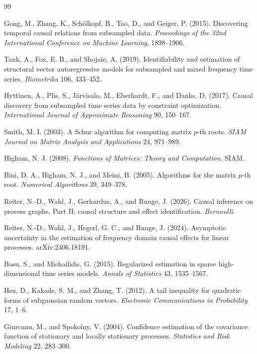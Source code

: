 \documentclass{article}
\begin{document}
\begin{thebibliography}{99}

   Gong, M., Zhang, K., Schölkopf, B., Tao, D., and Geiger, P. (2015). Discovering temporal causal relations from subsampled data. \emph{Proceedings of the 32nd International Conference on Machine Learning}, 1898--1906.

   Tank, A., Fox, E. B., and Shojaie, A. (2019). Identifiability and estimation of structural vector autoregressive models for subsampled and mixed frequency time series. \emph{Biometrika} 106, 433--452.

   Hyttinen, A., Plis, S., Järvisalo, M., Eberhardt, F., and Danks, D. (2017). Causal discovery from subsampled time series data by constraint optimization. \emph{International Journal of Approximate Reasoning} 90, 150--167.

   Smith, M. I. (2003). A Schur algorithm for computing matrix \(p\)-th roots. \emph{SIAM Journal on Matrix Analysis and Applications} 24, 971--989.

   Higham, N. J. (2008). \emph{Functions of Matrices: Theory and Computation}. SIAM.

   Bini, D. A., Higham, N. J., and Meini, B. (2005). Algorithms for the matrix \(p\)-th root. \emph{Numerical Algorithms} 39, 349--378.

   Reiter, N.-D., Wahl, J., Gerhardus, A., and Runge, J. (2026). Causal inference on process graphs, Part II: causal structure and effect identification. \emph{Bernoulli}.

   Reiter, N.-D., Wahl, J., Hegerl, G. C., and Runge, J. (2024). Asymptotic uncertainty in the estimation of frequency domain causal effects for linear processes. arXiv:2406.18191.

   Basu, S., and Michailidis, G. (2015). Regularized estimation in sparse high-dimensional time series models. \emph{Annals of Statistics} 43, 1535--1567.

   Hsu, D., Kakade, S. M., and Zhang, T. (2012). A tail inequality for quadratic forms of subgaussian random vectors. \emph{Electronic Communications in Probability} 17, 1--6.

   Giurcanu, M., and Spokoiny, V. (2004). Confidence estimation of the covariance function of stationary and locally stationary processes. \emph{Statistics and Risk Modeling} 22, 283--300.


\end{thebibliography}
\end{document}
